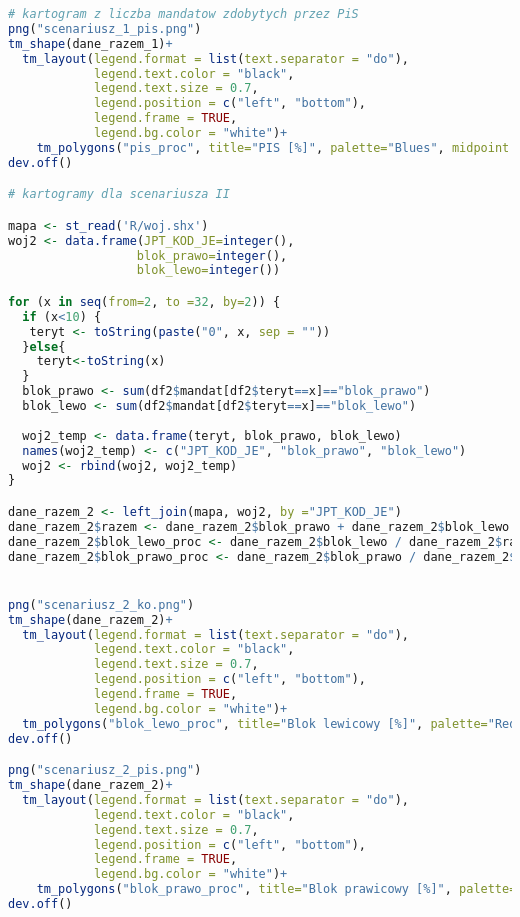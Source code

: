 \documentclass[12pt, a4paper, fleqn]{report}
\begin{document}
\begin{lstlisting}[language=R]
# kartogram z liczba mandatow zdobytych przez PiS
png("scenariusz_1_pis.png")
tm_shape(dane_razem_1)+
  tm_layout(legend.format = list(text.separator = "do"),
            legend.text.color = "black",
            legend.text.size = 0.7,
            legend.position = c("left", "bottom"),
            legend.frame = TRUE,
            legend.bg.color = "white")+
    tm_polygons("pis_proc", title="PIS [%]", palette="Blues", midpoint = 0)
dev.off()

# kartogramy dla scenariusza II

mapa <- st_read('R/woj.shx')
woj2 <- data.frame(JPT_KOD_JE=integer(),
                  blok_prawo=integer(),
                  blok_lewo=integer())

for (x in seq(from=2, to =32, by=2)) {
  if (x<10) {
   teryt <- toString(paste("0", x, sep = "")) 
  }else{
    teryt<-toString(x)
  }
  blok_prawo <- sum(df2$mandat[df2$teryt==x]=="blok_prawo")
  blok_lewo <- sum(df2$mandat[df2$teryt==x]=="blok_lewo")
  
  woj2_temp <- data.frame(teryt, blok_prawo, blok_lewo)
  names(woj2_temp) <- c("JPT_KOD_JE", "blok_prawo", "blok_lewo")
  woj2 <- rbind(woj2, woj2_temp)
}

dane_razem_2 <- left_join(mapa, woj2, by ="JPT_KOD_JE")
dane_razem_2$razem <- dane_razem_2$blok_prawo + dane_razem_2$blok_lewo
dane_razem_2$blok_lewo_proc <- dane_razem_2$blok_lewo / dane_razem_2$razem * 100
dane_razem_2$blok_prawo_proc <- dane_razem_2$blok_prawo / dane_razem_2$razem * 100


png("scenariusz_2_ko.png")
tm_shape(dane_razem_2)+
  tm_layout(legend.format = list(text.separator = "do"),
            legend.text.color = "black",
            legend.text.size = 0.7,
            legend.position = c("left", "bottom"),
            legend.frame = TRUE,
            legend.bg.color = "white")+
  tm_polygons("blok_lewo_proc", title="Blok lewicowy [%]", palette="Reds", midpoint = 100)
dev.off()

png("scenariusz_2_pis.png")
tm_shape(dane_razem_2)+
  tm_layout(legend.format = list(text.separator = "do"),
            legend.text.color = "black",
            legend.text.size = 0.7,
            legend.position = c("left", "bottom"),
            legend.frame = TRUE,
            legend.bg.color = "white")+
    tm_polygons("blok_prawo_proc", title="Blok prawicowy [%]", palette="Blues", midpoint = 0)
dev.off()
\end{lstlisting}



\appendix
%
\end{document}
